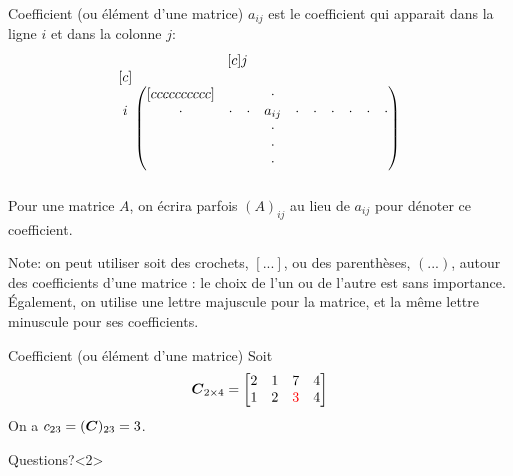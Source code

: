\documentclass[french, handout]{beamer}
\begin{document}
	\begin{frame}
		\begin{block}{Coefficient (ou élément d'une matrice)}
		$a_{ij}$ est le coefficient qui apparait dans la ligne $i$ et dans la colonne $j$:
\[
\begin{matrix}[c]
j\hspace*{1.1cm} \\
\begin{matrix}[c]\\ \\ i \\ \\ \\ \\ \\ \end{matrix}
\begin{pmatrix}[cccccccccc]
&&&\cdot&&&&&& \\
\cdot&\cdot&\cdot&a_{ij}&\cdot&\cdot&\cdot&\cdot&\cdot&\cdot\\
&&&\cdot&&&&&&\\
&&&\cdot&&&&&&\\
&&&\cdot&&&&&&
\end{pmatrix}
\end{matrix}
\]
		Pour une matrice $A$, on écrira parfois $(A)_{ij}$ au lieu de $a_{ij}$ pour dénoter ce coefficient.
	\end{block}
	Note: on peut utiliser soit des crochets, $[...]$, ou des parenthèses, $(...)$, autour des coefficients d'une matrice : le choix de l'un ou de l'autre est sans importance. Également, on utilise une lettre majuscule pour la matrice, et la même lettre minuscule pour ses coefficients.
	\end{frame}

	\begin{frame}{Coefficient (ou élément d'une matrice)}
	Soit
		\[
\boldsymbol{C}_{2\times4} = \begin{bmatrix}
2 & 1 & 7 & 4\\
1 & 2 & {\color{red}3} & 4
\end{bmatrix} \]
On a $c_{23} = (\boldsymbol{C})_{23} = 3$.
\begin{block}{Questions?}<2>
\end{block}
\end{frame}		
\end{document}
